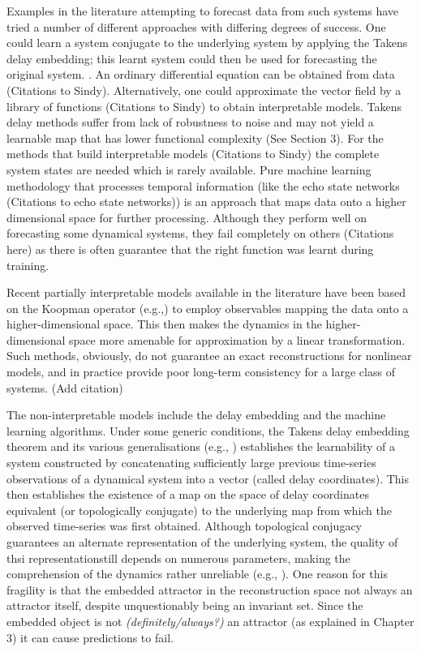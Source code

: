 \documentclass[12 pt]{article}
\begin{document}
Examples in the literature attempting to forecast data from such systems have tried a number of different approaches with differing degrees of success. One could learn a system conjugate to the underlying system by applying the Takens delay embedding; this learnt system could then be used for forecasting the original system. \cite{takens1981detecting}. An ordinary differential equation can be obtained from data (Citations to Sindy). Alternatively, one could approximate the vector field by a library of functions (Citations to Sindy) to obtain interpretable models. Takens delay methods suffer from lack of robustness to noise and may not yield a learnable map that has lower functional complexity (See Section 3). For the methods that build interpretable models (Citations to Sindy) the complete system states are needed which is rarely available. Pure machine learning methodology that processes temporal information (like the echo state networks (Citations to echo state networks)) is an approach that maps data onto a higher dimensional space for further processing. Although they perform  well on forecasting some dynamical systems, they fail completely on others (Citations here) as there is often guarantee that the right function was learnt during training.

Recent partially interpretable models available in the literature have been based on the Koopman operator (e.g.,\cite{koopman1932dynamical,budivsic2012applied}) to  employ observables mapping the data onto a higher-dimensional space. This then makes the dynamics in the higher-dimensional space more amenable for approximation by a linear transformation. Such methods, obviously, do not guarantee an exact reconstructions for nonlinear models, and in practice provide poor long-term consistency for a large class of systems. (Add citation)

The non-interpretable models include the delay embedding and the machine learning algorithms. Under some generic conditions, the Takens delay embedding theorem \cite{takens1981detecting} and its various generalisations (e.g., \cite{sauer1991embedology, stark1999delay, gutman2018embedding, gutman2018embedding}) establishes the learnability of a system constructed by concatenating sufficiently large previous time-series observations of a dynamical system into a vector (called delay coordinates). This then establishes the existence of a map on the space of delay coordinates equivalent (or topologically conjugate) to the underlying map from which the observed time-series was first obtained. Although topological conjugacy guarantees an alternate representation of the underlying system, the quality of thsi representationstill depends on numerous parameters, making the comprehension of the dynamics rather unreliable (e.g., \cite{principe1992prediction}). One reason for this fragility is that the embedded attractor in the reconstruction space not always an attractor itself, despite  unquestionably being an invariant set. Since the embedded object is not \emph{(definitely/always?)} an attractor (as explained in Chapter 3) it can cause predictions to fail.
\end{document}
